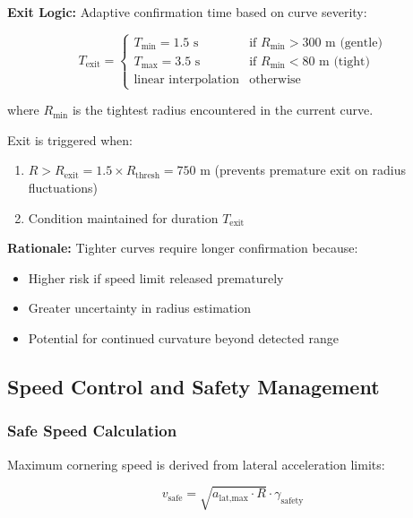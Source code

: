 \documentclass[12pt]{article}
\begin{document}
\textbf{Exit Logic:} Adaptive confirmation time based on curve severity:

\begin{equation}
T_{\text{exit}} = \begin{cases}
T_{\text{min}} = 1.5 \text{ s} & \text{if } R_{\text{min}} > 300 \text{ m (gentle)} \\
T_{\text{max}} = 3.5 \text{ s} & \text{if } R_{\text{min}} < 80 \text{ m (tight)} \\
\text{linear interpolation} & \text{otherwise}
\end{cases}
\end{equation}

where $R_{\text{min}}$ is the tightest radius encountered in the current curve.

Exit is triggered when:
\begin{enumerate}
    \item $R > R_{\text{exit}} = 1.5 \times R_{\text{thresh}} = 750$ m (prevents premature exit on radius fluctuations)
    \item Condition maintained for duration $T_{\text{exit}}$
\end{enumerate}

\textbf{Rationale:} Tighter curves require longer confirmation because:
\begin{itemize}
    \item Higher risk if speed limit released prematurely
    \item Greater uncertainty in radius estimation
    \item Potential for continued curvature beyond detected range
\end{itemize}

\subsection{Speed Control and Safety Management}

\subsubsection{Safe Speed Calculation}

Maximum cornering speed is derived from lateral acceleration limits:

\begin{equation}
v_{\text{safe}} = \sqrt{a_{\text{lat,max}} \cdot R} \cdot \gamma_{\text{safety}}
\end{equation}
\end{document}
